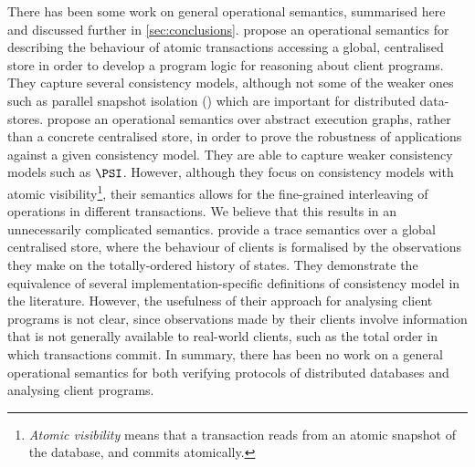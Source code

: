 There has been some work on general operational semantics, summarised
here and discussed further in \cref{sec:conclusions}.
\cite{alonetogether} propose an operational
semantics for describing the behaviour of  atomic transactions
accessing a global, centralised store 
in order to develop 
a program logic  for reasoning about client programs. They capture 
 several consistency models, although not some of the  weaker ones
 such as parallel snapshot isolation (\PSI)
 which are important 
for distributed data-stores.
\cite{sureshConcur} propose an operational semantics over abstract
execution graphs, rather than   a concrete centralised store, in order to
prove the robustness of applications against
a given consistency model. They are able to 
capture weaker consistency models
such as \(\PSI\). However, although they focus on consistency models with atomic 
visibility\footnote{\emph{Atomic visibility} means that a transaction 
reads from an atomic snapshot of the database, and commits atomically.},
their semantics allows for the fine-grained interleaving of operations in different
transactions. We believe that this results  in an unnecessarily complicated semantics.
\cite{seebelieve} provide a trace semantics over a global
centralised store, where the behaviour of clients is formalised by the   
observations they make on the totally-ordered history of states. 
They 
demonstrate  the equivalence of several
implementation-specific definitions of
consistency model  in the literature. 
However, the usefulness  of their approach for analysing client programs is not clear, 
since observations made by their clients  involve information that is not generally 
available to real-world clients,  such as the total order in which transactions commit.
In summary, there has been no work on a general operational semantics 
for both verifying protocols of distributed databases and 
analysing  client programs. 


